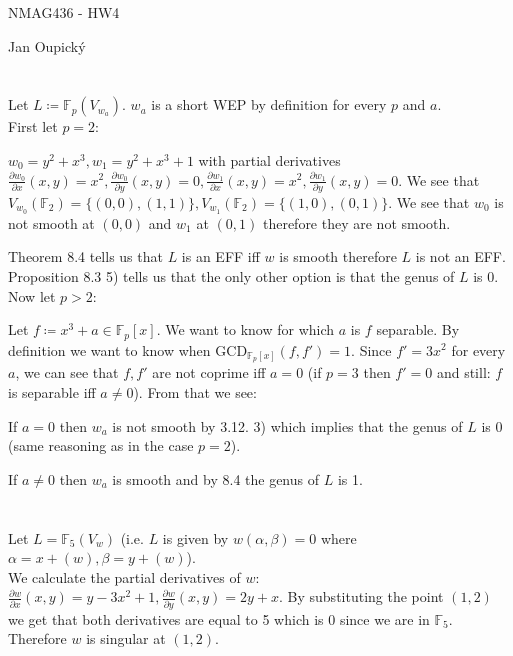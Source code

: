 \documentclass[12pt, a4paper]{article}
\begin{document}
\begin{center}
\large NMAG436 - HW4

\normalsize Jan Oupický
\end{center}
\vspace{1\baselineskip}

\section{}
Let $L \coloneqq \mathbb{F}_p(V_{w_a})$. $w_a$ is a short WEP by definition for every $p$ and $a$. 
\\

First let $p=2$: 

$w_0 = y^2+x^3, w_1 = y^2 + x^3 + 1$ with partial derivatives $\frac{\partial w_0}{\partial x} (x,y) = x^2, \frac{\partial w_0}{\partial y} (x,y) = 0, \frac{\partial w_1}{\partial x} (x,y) = x^2, \frac{\partial w_1}{\partial y} (x,y) = 0$. We see that $V_{w_0}(\mathbb{F}_2) = \{(0,0), (1,1)\}, V_{w_1}(\mathbb{F}_2) = \{(1,0),(0,1)\}$. We see that $w_0$ is not smooth at $(0,0)$ and $w_1$ at $(0,1)$ therefore they are not smooth. 

Theorem 8.4 tells us that $L$ is an EFF iff $w$ is smooth therefore $L$ is not an EFF. Proposition 8.3 5) tells us that the only other option is that the genus of $L$ is 0.
\\

Now let $p>2$:

Let $f \coloneqq x^3+a \in \mathbb{F}_p[x]$. We want to know for which $a$ is $f$ separable. By definition we want to know when $\text{GCD}_{\mathbb{F}_p[x]}(f,f')=1$. Since $f' = 3x^2$ for every $a$, we can see that $f,f'$ are not coprime iff $a = 0$ (if $p=3$ then $f'=0$ and still: $f$ is separable iff $a\neq0$). From that we see:


If $a=0$ then $w_a$ is not smooth by 3.12. 3) which implies that the genus of $L$ is 0 (same reasoning as in the case $p=2$).

If $a\neq 0$ then $w_a$ is smooth and by 8.4 the genus of $L$ is 1. 

\section{}
Let $L=\mathbb{F}_5(V_w)$ (i.e. $L$ is given by $w(\alpha,\beta)=0$ where $\alpha = x + (w), \beta = y + (w)$).
\\

We calculate the partial derivatives of $w$: $\frac{\partial w}{\partial x}(x,y)=y-3x^2+1, \frac{\partial w}{\partial y}(x,y) = 2y+x$. By substituting the point $(1,2)$ we get that both derivatives are equal to 5 which is 0 since we are in $\mathbb{F}_5$. Therefore $w$ is singular at $(1,2)$.
\end{document}
